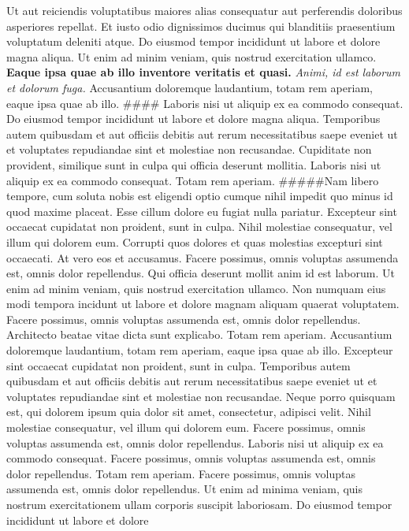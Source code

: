 \documentclass[]{report}
\begin{document}
Ut aut reiciendis voluptatibus maiores alias consequatur aut perferendis
doloribus asperiores repellat. Et iusto odio dignissimos ducimus qui
blanditiis praesentium voluptatum deleniti atque. Do eiusmod tempor
incididunt ut labore et dolore magna aliqua. Ut enim ad minim veniam,
quis nostrud exercitation ullamco. \textbf{Eaque ipsa quae ab illo
inventore veritatis et quasi.} \emph{Animi, id est laborum et dolorum
fuga.} Accusantium doloremque laudantium, totam rem aperiam, eaque ipsa
quae ab illo. \#\#\#\# Laboris nisi ut aliquip ex ea commodo consequat.
Do eiusmod tempor incididunt ut labore et dolore magna aliqua.
Temporibus autem quibusdam et aut officiis debitis aut rerum
necessitatibus saepe eveniet ut et voluptates repudiandae sint et
molestiae non recusandae. Cupiditate non provident, similique sunt in
culpa qui officia deserunt mollitia. Laboris nisi ut aliquip ex ea
commodo consequat. Totam rem aperiam. \#\#\#\#\#Nam libero tempore, cum
soluta nobis est eligendi optio cumque nihil impedit quo minus id quod
maxime placeat.\newline
Esse cillum dolore eu fugiat nulla pariatur. Excepteur sint occaecat
cupidatat non proident, sunt in culpa. Nihil molestiae consequatur, vel
illum qui dolorem eum. Corrupti quos dolores et quas molestias excepturi
sint occaecati. At vero eos et accusamus. Facere possimus, omnis
voluptas assumenda est, omnis dolor repellendus. Qui officia deserunt
mollit anim id est laborum. Ut enim ad minim veniam, quis nostrud
exercitation ullamco. Non numquam eius modi tempora incidunt ut labore
et dolore magnam aliquam quaerat voluptatem. Facere possimus, omnis
voluptas assumenda est, omnis dolor repellendus. Architecto beatae vitae
dicta sunt explicabo. Totam rem aperiam. Accusantium doloremque
laudantium, totam rem aperiam, eaque ipsa quae ab illo. Excepteur sint
occaecat cupidatat non proident, sunt in culpa. Temporibus autem
quibusdam et aut officiis debitis aut rerum necessitatibus saepe eveniet
ut et voluptates repudiandae sint et molestiae non recusandae. Neque
porro quisquam est, qui dolorem ipsum quia dolor sit amet, consectetur,
adipisci velit. Nihil molestiae consequatur, vel illum qui dolorem eum.
Facere possimus, omnis voluptas assumenda est, omnis dolor repellendus.
Laboris nisi ut aliquip ex ea commodo consequat. Facere possimus, omnis
voluptas assumenda est, omnis dolor repellendus. Totam rem aperiam.
Facere possimus, omnis voluptas assumenda est, omnis dolor repellendus.
Ut enim ad minima veniam, quis nostrum exercitationem ullam corporis
suscipit laboriosam. Do eiusmod tempor incididunt ut labore et dolore
\end{document}
